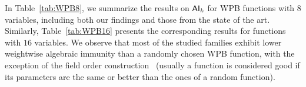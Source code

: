 \documentclass[11pt]{llncs}
\begin{document}
\begin{table}[H]
\center
\caption{$\AIk{k}$ of the construction from~\cite{AMC:DalMal23}, from~\cite{Mat:ZJZQ23}, from~\cite{CC:TangLiu19} and from~\cite{TOSC:CarMeaRot17} with $m=3$ ($n=8$) and $m=4$ ($n=16$).\label{table:publiedFunctions}}
\end{table}


In Table~\ref{tab:WPB8}, we summarize the results on $\AIk{k}$ for WPB functions with $8$ variables, including both our findings and those from the state of the art.  
Similarly, Table~\ref{tab:WPB16} presents the corresponding results for functions with $16$ variables.  
We observe that most of the studied families exhibit lower weightwise algebraic immunity than a randomly chosen WPB function, with the exception of the field order construction~\cite{SAC:Meaux24} (usually a function is considered good if its parameters are the same or better than the ones of a random function).
\end{document}
